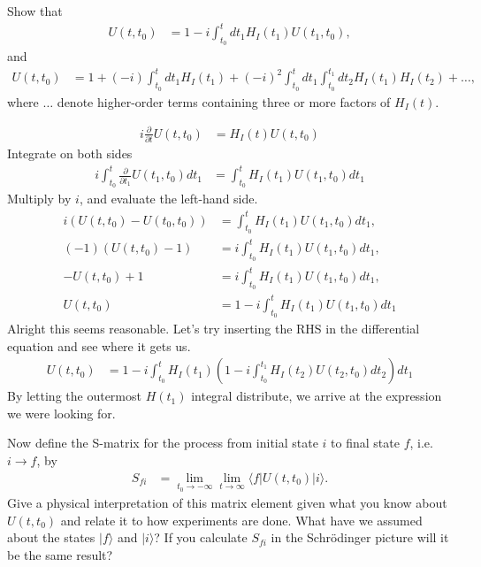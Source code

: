 \documentclass[working, oneside]{../../Preambles/tuftebook}
\begin{document}
\begin{exercise}[3]
Show that
\begin{align*}
U(t, t_0)
&= 1 - i \int_{t_0}^t dt_1 H_I(t_1) U(t_1, t_0), \tag{50}
\end{align*}
and
\begin{align*}
U(t, t_0)
&= 1 + (-i) \int_{t_0}^t dt_1 H_I(t_1) + (-i)^2 \int_{t_0}^t dt_1 \int_{t_0}^{t_1} dt_2 H_I(t_1) H_I(t_2) + \dots, \tag{51}
\end{align*}
where \( \dots \) denote higher-order terms containing three or more factors of \( H_I(t) \).
\end{exercise}
\begin{solution}
\begin{align*}
i \frac{\partial}{\partial t} U(t, t_0)
&= H_I(t) U(t, t_0)
\end{align*}
Integrate on both sides
\begin{align*}
i \int_{t_0}^t \frac{\partial}{\partial t_1} U(t_1, t_0) dt_1
&= \int_{t_0}^t H_I(t_1) U(t_1, t_0) dt_1
\end{align*}
Multiply by \( i \), and evaluate the left-hand side.
\begin{align*}
i (U(t, t_0) - U(t_0, t_0))
&= \int_{t_0}^t H_I(t_1) U(t_1, t_0) dt_1, \\
(-1) (U(t, t_0) - 1)
&= i \int_{t_0}^t H_I(t_1) U(t_1, t_0) dt_1, \\
-U(t, t_0) + 1
&= i \int_{t_0}^t H_I(t_1) U(t_1, t_0) dt_1, \\
U(t, t_0)
&= 1 - i \int_{t_0}^t H_I(t_1) U(t_1, t_0) dt_1
\end{align*}
Alright this seems reasonable. Let's try inserting the RHS in the differential equation and see where it gets us.
\begin{align*}
U(t, t_0)
&= 1 - i \int_{t_0}^t H_I(t_1) \left( 1 - i \int_{t_0}^{t_1} H_I(t_2) U(t_2, t_0) dt_2 \right) dt_1
\end{align*}
By letting the outermost $H\left( t_1 \right) $ integral distribute, we arrive at the expression we were looking for.
\end{solution}
\begin{exercise}[4]
Now define the S-matrix for the process from initial state \( i \) to final state \( f \), i.e. \( i \rightarrow f \), by
\begin{align*}
S_{fi}
&= \lim_{t_0 \rightarrow -\infty} \lim_{t \rightarrow \infty} \langle f | U(t, t_0) | i \rangle. \tag{52}
\end{align*}
Give a physical interpretation of this matrix element given what you know about \( U(t, t_0) \) and relate it to how experiments are done. What have we assumed about the states \( |f\rangle \) and \( |i\rangle \)? If you calculate \( S_{fi} \) in the Schrödinger picture will it be the same result?
\end{exercise}
\end{document}
